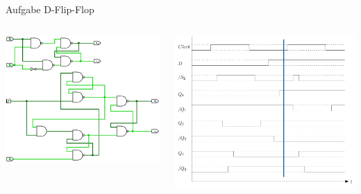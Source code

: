 \begin{frame}{Aufgabe \thesection}{D-Flip-Flop}
  \begin{solutionnoinc}
    \begin{columns}
      \begin{column}{0.5\textwidth}
        \includegraphics[height=0.5\paperheight, center]{./figures/comparison010.png}
      \end{column}
      \begin{column}{0.5\textwidth}
        \includegraphics[height=0.5\paperheight, center]{./figures/timing_diagram_4.png}
      \end{column}
    \end{columns}
  \end{solutionnoinc}
\end{frame}
